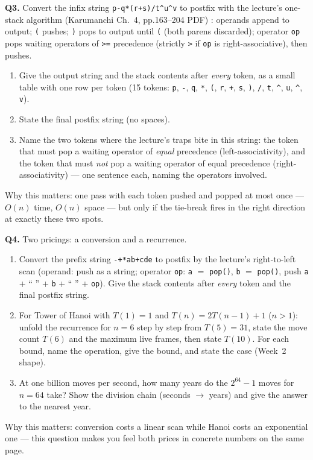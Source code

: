 \documentclass[11pt]{article}
\begin{document}
\textbf{Q3.} Convert the infix string \texttt{p-q*(r+s)/t\^{}u\^{}v} to postfix with the lecture's one-stack algorithm (Karumanchi Ch.~4, pp.163--204 PDF) \cite{Karumanchi2017_data_structures_algorithms_made_easy}: operands append to output; \texttt{(} pushes; \texttt{)} pops to output until \texttt{(} (both parens discarded); operator \texttt{op} pops waiting operators of \texttt{>=} precedence (strictly \texttt{>} if \texttt{op} is right-associative), then pushes.
\begin{enumerate}
  \item[(a)] Give the output string and the stack contents after \emph{every} token, as a small table with one row per token (15 tokens: \texttt{p}, \texttt{-}, \texttt{q}, \texttt{*}, \texttt{(}, \texttt{r}, \texttt{+}, \texttt{s}, \texttt{)}, \texttt{/}, \texttt{t}, \texttt{\^{}}, \texttt{u}, \texttt{\^{}}, \texttt{v}).
  \item[(b)] State the final postfix string (no spaces).
  \item[(c)] Name the two tokens where the lecture's traps bite in this string: the token that must pop a waiting operator of \emph{equal} precedence (left-associativity), and the token that must \emph{not} pop a waiting operator of equal precedence (right-associativity) --- one sentence each, naming the operators involved.
\end{enumerate}
Why this matters: one pass with each token pushed and popped at most once --- $O(n)$ time, $O(n)$ space --- but only if the tie-break fires in the right direction at exactly these two spots.

\textbf{Q4.} Two pricings: a conversion and a recurrence.
\begin{enumerate}
  \item[(a)] Convert the prefix string \texttt{-+*ab+cde} to postfix by the lecture's right-to-left scan (operand: push as a string; operator \texttt{op}: \texttt{a} $=$ \texttt{pop()}, \texttt{b} $=$ \texttt{pop()}, push \texttt{a} + `` '' + \texttt{b} + `` '' + \texttt{op}). Give the stack contents after \emph{every} token and the final postfix string.
  \item[(b)] For Tower of Hanoi with $T(1) = 1$ and $T(n) = 2T(n-1) + 1$ ($n > 1$): unfold the recurrence for $n = 6$ step by step from $T(5) = 31$, state the move count $T(6)$ and the maximum live frames, then state $T(10)$. For each bound, name the operation, give the bound, and state the case (Week~2 shape).
  \item[(c)] At one billion moves per second, how many years do the $2^{64} - 1$ moves for $n = 64$ take? Show the division chain (seconds $\to$ years) and give the answer to the nearest year.
\end{enumerate}
Why this matters: conversion costs a linear scan while Hanoi costs an exponential one --- this question makes you feel both prices in concrete numbers on the same page.
\end{document}
